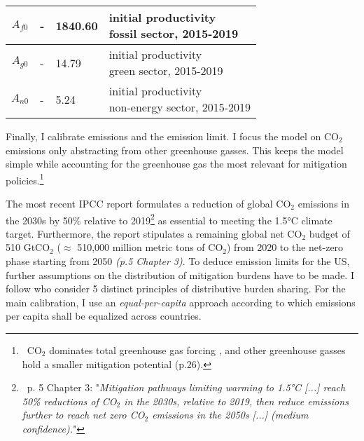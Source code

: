 \begin{table}[h!]
\begin{center}
\begin{tabular}{c|lll}
 			\hline
 			$A_{f0}$&- &1840.60& \makecell[l]{initial productivity \\ fossil sector, 2015-2019}  \\
 			\hline
 			$A_{g0}$&- &14.79& \makecell[l]{initial productivity \\ green sector, 2015-2019}  \\
 			\hline
 			$A_{n0}$&- &5.24& \makecell[l]{initial productivity \\ non-energy sector, 2015-2019}  \\
 			\hline \hline
 		\end{tabular}
 	\end{center}
 \end{table}
 \clearpage
 
 
 Finally, I calibrate emissions and the emission limit.  I focus the model on CO$_2$ emissions only abstracting from other greenhouse gasses. This keeps the model simple while accounting for the greenhouse gas the most relevant for mitigation policies.\footnote{\ CO$_2$ dominates total greenhouse gas forcing \citep[p.29]{IPCC2022}, and other greenhouse gasses hold a smaller mitigation potential (p.26).}
 
 The most recent IPCC report \citep{IPCC2022} formulates a reduction of global CO$_2$ emissions in the 2030s by 50\% relative to 2019\footnote{\ p. 5 Chapter 3: "\textit{Mitigation pathways limiting warming to 1.5°C [...] reach 50\% reductions of CO$_2$ in the 2030s, relative to 2019, then reduce emissions further to reach net zero CO$_2$ emissions in the 2050s [...] (\textnormal{medium confidence}).}"}  as essential to meeting the 1.5°C climate target.  Furthermore, the report stipulates a remaining global net CO$_2$ budget of 510 GtCO$_2$ ($\approx$ 510,000 million metric tons of CO$_2$) from 2020 to the net-zero phase starting from 2050 \textit{(p.5 Chapter 3)}. 
To deduce emission limits for the US, further assumptions on the distribution of mitigation burdens have to be made. I follow \cite{RobiouDuPont2017EquitableGoals} who consider 5 distinct principles of distributive burden sharing. For the main calibration, I use an \textit{equal-per-capita} approach according to which emissions per capita shall be equalized across countries. 
 

